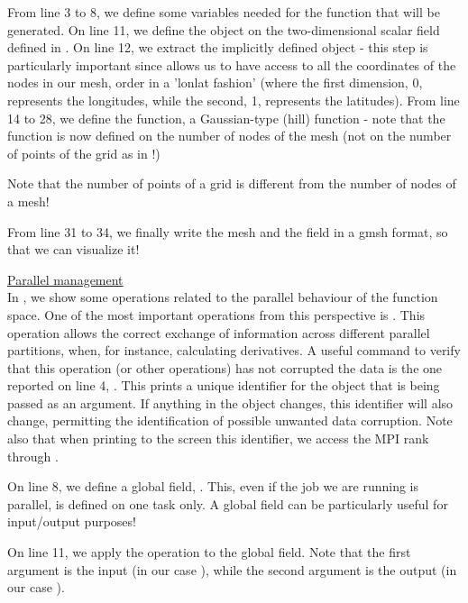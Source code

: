\begin{description}
From line 3 to 8, we define some variables needed for the function 
that will be generated. On line 11, we define the  
object on the two-dimensional scalar field defined in .
On line 12, we extract the implicitly defined  object 
- this step is particularly important since allows us to have access 
to all the coordinates of the nodes in our mesh, order in a 'lonlat
fashion' (where the first dimension, 0, represents the longitudes, 
while the second, 1, represents the latitudes).	
From line 14 to 28, we define the function, a Gaussian-type (hill) 
function - note that the function is now defined on the number of 
nodes of the mesh (not on the number of points of the grid as in 
!)
%
\begin{warningbox}
Note that the number of points of a grid is different from the number 
of nodes of a mesh!
\end{warningbox}
%
From line 31 to 34, we finally write the mesh and the field in a gmsh 
format, so that we can visualize it!
%

%
%
\item \underline{Parallel management}\\[0.5em]
%
In , we show some operations related to the 
parallel behaviour of the function space. One of the most important
operations from this perspective is . This 
operation allows the correct exchange of information across different 
parallel partitions, when, for instance, calculating derivatives.
A useful command to verify that this operation (or other operations) 
has not corrupted the data is the one reported on line 4, .
This prints a unique identifier for the object that is being passed 
as an argument. If anything in the object changes, this identifier 
will also change, permitting the identification of possible unwanted 
data corruption. Note also that when printing to the screen this identifier,
we access the MPI rank through .

On line 8, we define a global field, . 
This, even if the job we are running is parallel, is defined on one task 
only. A global field can be particularly useful for input/output purposes!

On line 11, we apply the  operation to the global field.
Note that the first argument is the input (in our case ),
while the second argument is the output (in our case ).


\end{description}
